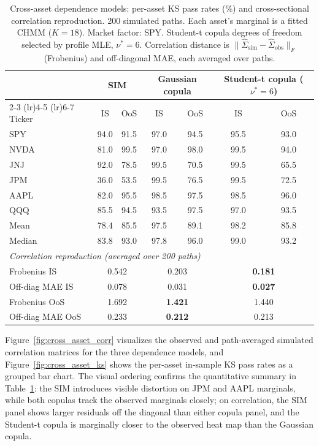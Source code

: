 \begin{table}[t]
\centering
\caption{Cross-asset dependence models: per-asset KS pass rates (\%) and cross-sectional correlation reproduction. 200 simulated paths. Each asset's marginal is a fitted CHMM ($K = 18$). Market factor: SPY. Student-t copula degrees of freedom selected by profile MLE, $\nu^* = 6$. Correlation distance is $\|\hat{\Sigma}_{\text{sim}} - \hat{\Sigma}_{\text{obs}}\|_F$ (Frobenius) and off-diagonal MAE, each averaged over paths.}
\label{tab:cross_asset_sim_copula}
\small
\begin{tabular}{l cc cc cc}
\toprule
& \multicolumn{2}{c}{SIM} & \multicolumn{2}{c}{Gaussian copula} & \multicolumn{2}{c}{Student-t copula ($\nu^* = 6$)} \\
\cmidrule(lr){2-3} \cmidrule(lr){4-5} \cmidrule(lr){6-7}
Ticker & IS & OoS & IS & OoS & IS & OoS \\
\midrule
SPY   & 94.0 & 91.5 & 97.0 & 94.5 & 95.5  & 93.0 \\
NVDA  & 81.0 & 99.5 & 97.0 & 98.0 & 99.5  & 94.0 \\
JNJ   & 92.0 & 78.5 & 99.5 & 70.5 & 99.5  & 65.5 \\
JPM   & 36.0 & 53.5 & 99.5 & 76.5 & 99.5  & 72.5 \\
AAPL  & 82.0 & 95.5 & 98.5 & 97.5 & 98.5  & 96.0 \\
QQQ   & 85.5 & 94.5 & 93.5 & 97.5 & 97.0  & 93.5 \\
\midrule
Mean   & 78.4 & 85.5 & 97.5 & 89.1 & 98.2 & 85.8 \\
Median & 83.8 & 93.0 & 97.8 & 96.0 & 99.0 & 93.2 \\
\midrule
\multicolumn{7}{l}{\textit{Correlation reproduction (averaged over 200 paths)}} \\
Frobenius IS         & \multicolumn{2}{c}{0.542} & \multicolumn{2}{c}{0.203} & \multicolumn{2}{c}{\textbf{0.181}} \\
Off-diag MAE IS      & \multicolumn{2}{c}{0.078} & \multicolumn{2}{c}{0.031} & \multicolumn{2}{c}{\textbf{0.027}} \\
Frobenius OoS        & \multicolumn{2}{c}{1.692} & \multicolumn{2}{c}{\textbf{1.421}} & \multicolumn{2}{c}{1.440} \\
Off-diag MAE OoS     & \multicolumn{2}{c}{0.233} & \multicolumn{2}{c}{\textbf{0.212}} & \multicolumn{2}{c}{0.213} \\
\bottomrule
\end{tabular}
\end{table}

Figure~\ref{fig:cross_asset_corr} visualizes the observed and path-averaged simulated correlation matrices for the three dependence models, and Figure~\ref{fig:cross_asset_ks} shows the per-asset in-sample KS pass rates as a grouped bar chart.
The visual ordering confirms the quantitative summary in Table~\ref{tab:cross_asset_sim_copula}: the SIM introduces visible distortion on JPM and AAPL marginals, while both copulas track the observed marginals closely; on correlation, the SIM panel shows larger residuals off the diagonal than either copula panel, and the Student-t copula is marginally closer to the observed heat map than the Gaussian copula.


